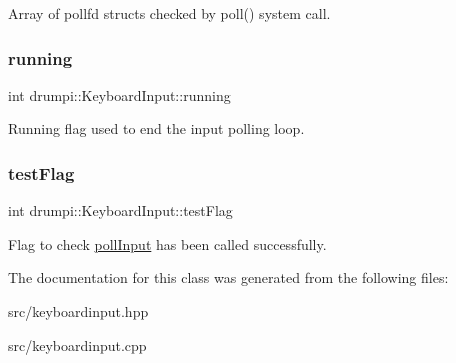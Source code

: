 Array of pollfd structs checked by poll() system call. \mbox{\label{classdrumpi_1_1KeyboardInput_a92b9933a95405da091d18b8b3116699b}} 
\subsubsection{\texorpdfstring{running}{running}}
{\footnotesize\ttfamily int drumpi\+::\+Keyboard\+Input\+::running}

Running flag used to end the input polling loop. \mbox{\label{classdrumpi_1_1KeyboardInput_a1817959cdce29597ad61ba635674bc6f}} 
\subsubsection{\texorpdfstring{test\+Flag}{testFlag}}
{\footnotesize\ttfamily int drumpi\+::\+Keyboard\+Input\+::test\+Flag\hspace{0.3cm}{\ttfamily [private]}}

Flag to check \hyperlink{classdrumpi_1_1KeyboardInput_ac74a81a24054aa5e927e03b4ba7f8c9f}{poll\+Input} has been called successfully. 

The documentation for this class was generated from the following files\+:\begin{DoxyCompactItemize}
\item 
src/keyboardinput.\+hpp\item 
src/keyboardinput.\+cpp\end{DoxyCompactItemize}
